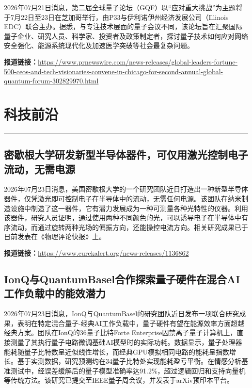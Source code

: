 \documentclass[12pt,a4paper]{ctexart}
\begin{document}
2026年07月21日消息，第二届全球量子论坛（GQF）以“应对重大挑战”为主题将于7月22日至23日在芝加哥举行，由P33与伊利诺伊州经济发展公司（Illinois EDC）联合主办。据悉，与专注技术层面的量子会议不同，该论坛旨在汇聚国际量子企业、研究人员、科学家、投资者及政策制定者，探讨量子技术如何应对网络安全强化、能源系统现代化及加速医学突破等社会最复杂问题。

\noindent\textbf{报道链接：}\url{https://www.prnewswire.com/news-releases/global-leaders-fortune-500-ceos-and-tech-visionaries-convene-in-chicago-for-second-annual-global-quantum-forum-302829970.html}


\newpage
\section{科技前沿}
\vspace{-0.5em}
\noindent\rule{\linewidth}{1.5pt}

\subsection{ 密歇根大学研发新型半导体器件，可仅用激光控制电子流动，无需电源 }

2026年07月23日消息，美国密歇根大学的一个研究团队近日打造出一种新型半导体器件，仅凭激光即可控制电子在半导体中的流动，无需任何电源。该团队在纳米制造设施中制造了这一器件，它有潜力发展成为一种可测量各种光特性的仪器。利用该器件，研究人员证明，通过使用两种不同颜色的光，可以诱导电子在半导体中有序流动，而通过旋转两种光场的偏振方向，还能操控电流方向。相关研究成果已于日前发表在《物理评论快报》上。

\noindent\textbf{报道链接：}\url{https://www.eurekalert.org/news-releases/1136862}

\subsection{ IonQ与QuantumBasel合作探索量子硬件在混合AI工作负载中的能效潜力 }

2026年07月23日消息，IonQ与QuantumBasel的研究团队近日发布一项联合研究成果，表明在特定混合量子-经典AI工作负载中，量子硬件有望在能源效率方面超越经典方案。团队在IonQ的36量子比特Forte Enterprise囚禁离子量子计算机上，直接测量了其执行量子电路微调基础AI模型时的实际功耗。数据显示，量子处理器能耗随量子比特数呈近似线性增长，而经典GPU模拟相同电路的能耗呈指数增长。基于实测数据，研究预测约在34量子比特处实现能耗盈亏平衡。在情感分析基准测试中，经误差缓解后的量子模型准确率达91.2\%，超过逻辑回归和支持向量机等传统方法。该研究已提交至IEEE量子周会议，并发表于arXiv预印本平台。
\end{document}
